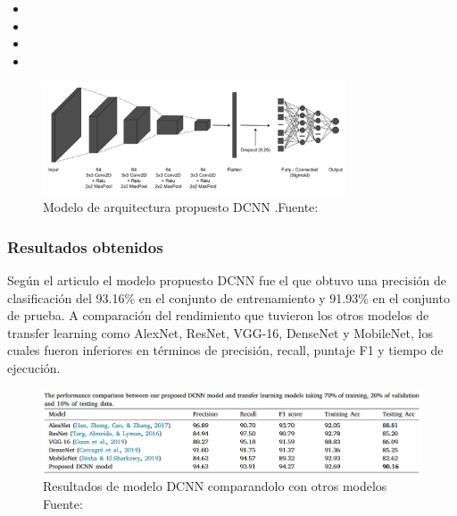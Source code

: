 \begin{itemize}
	\item \MEone
	\item \MEtwo
	\item \MEthree
	\item \MEfour

\end{itemize}

\begin{figure}[h]
	\begin{center}
		\includegraphics[width=0.8\textwidth]{2/figuras/Problematica_An_enhanced_tecniques_imagen_02.png}
		\caption{Modelo de arquitectura propuesto DCNN .Fuente: \cite{ali_2021enhanced}}
		\label{1:fig 5}
	\end{center}
\end{figure}


\subsubsection{Resultados obtenidos}
Según el articulo el modelo propuesto DCNN fue el que obtuvo una precisión de clasificación del 93.16\% en el conjunto de entrenamiento y 91.93\% en el conjunto de prueba. A comparación del rendimiento que tuvieron los otros modelos de transfer learning como AlexNet, ResNet, VGG-16, DenseNet y MobileNet, los cuales fueron inferiores en términos de precisión, recall, puntaje F1 y tiempo de ejecución.

\begin{figure}[h]
	\begin{center}
		\includegraphics[width=1\textwidth]{2/figuras/Problematica_An_enhanced_tecniques_imagen_01.png}
		\caption{Resultados de modelo DCNN comparandolo con otros modelos Fuente: \cite{ali_2021enhanced}}
		\label{1:fig 6}
	\end{center}
\end{figure}




